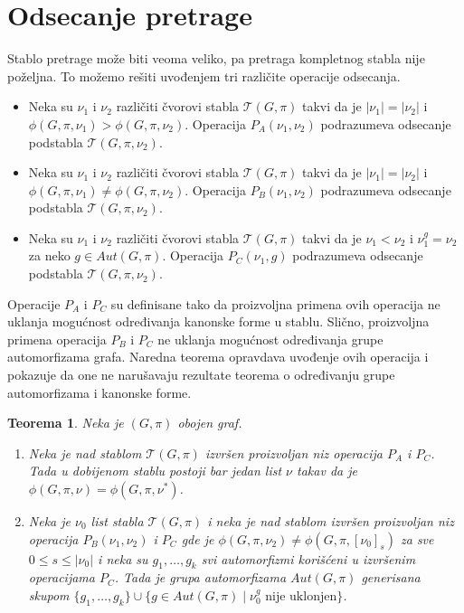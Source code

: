 \documentclass[12pt,oneside]{memoir}
\newtheorem{theorem}{Teorema}
\theoremstyle{definition}
\begin{document}
 \section{Odsecanje pretrage}

  Stablo pretrage može biti veoma veliko, pa pretraga kompletnog stabla nije
  poželjna. To možemo rešiti uvođenjem tri različite operacije odsecanja.
  \begin{itemize}
	  \item Neka su $\nu_1$ i $\nu_2$ različiti čvorovi stabla $\mathcal{T}(G,
		  \pi)$ takvi da je $|\nu_1|=|\nu_2|$ i $\phi(G, \pi, \nu_1) >
		  \phi(G, \pi, \nu_2)$. Operacija $P_A(\nu_1, \nu_2)$ podrazumeva
		  odsecanje podstabla $\mathcal{T}(G, \pi, \nu_2)$.
	  \item Neka su $\nu_1$ i $\nu_2$ različiti čvorovi stabla $\mathcal{T}(G,
		  \pi)$ takvi da je $|\nu_1|=|\nu_2|$ i $\phi(G, \pi, \nu_1) \neq
		  \phi(G, \pi, \nu_2)$. Operacija $P_B(\nu_1, \nu_2)$ podrazumeva
		  odsecanje podstabla $\mathcal{T}(G, \pi, \nu_2)$.
	  \item Neka su $\nu_1$ i $\nu_2$ različiti čvorovi stabla $\mathcal{T}(G,
		  \pi)$ takvi da je $\nu_1 < \nu_2$ i $\nu_1^g=\nu_2$ za neko $g \in
		  Aut(G, \pi)$. Operacija $P_C(\nu_1, g)$ podrazumeva odsecanje
		  podstabla $\mathcal{T}(G, \pi, \nu_2)$.
  \end{itemize}

  Operacije $P_A$ i $P_C$ su definisane tako da proizvoljna primena ovih
  operacija ne uklanja mogućnost određivanja kanonske forme u stablu. Slično,
  proizvoljna primena operacija $P_B$ i $P_C$ ne uklanja mogućnost određivanja
  grupe automorfizama grafa. Naredna teorema opravdava uvođenje ovih operacija
  i pokazuje da one ne narušavaju rezultate teorema o određivanju grupe
  automorfizama i kanonske forme.

  \begin{theorem}
	  Neka je $(G, \pi)$ obojen graf.
	  \begin{enumerate}
		  \item Neka je nad stablom $\mathcal{T}(G, \pi)$ izvršen proizvoljan
			  niz operacija $P_A$ i $P_C$. Tada u dobijenom stablu postoji bar
			  jedan list $\nu$ takav da je $\phi(G, \pi, \nu) = \phi(G, \pi,
			  \nu^*)$.
		  \item Neka je $\nu_0$ list stabla $\mathcal{T}(G, \pi)$ i neka je nad
			  stablom izvršen proizvoljan niz operacija $P_B(\nu_1, \nu_2)$ i
			  $P_C$ gde je $\phi(G, \pi, \nu_2) \neq \phi(G, \pi,
			  [\nu_0]_{s})$ za sve $0 \leq s \leq |\nu_0|$ i neka su $g_1,
			  \dots, g_k$ svi automorfizmi korišćeni u izvršenim operacijama
			  $P_C$.  Tada je grupa automorfizama $Aut(G, \pi)$ generisana
			  skupom $\{g_1, \dots, g_k\} \cup \{g \in Aut(G, \pi) \mid \nu_0^g
			  \text{ nije uklonjen}\}$.
	  \end{enumerate}
  \end{theorem}
\end{document}
